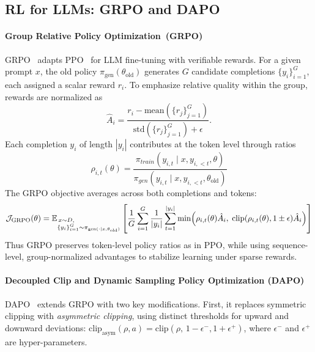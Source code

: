 \documentclass[]{fairmeta} %
\begin{document}
\subsection{RL for LLMs: GRPO and DAPO}\label{appendix:background}

\paragraph{Group Relative Policy Optimization~(GRPO)}
GRPO~\citep{shao2024deepseekmath} adapts PPO~\cite{schulman2017ppo} for LLM fine-tuning with verifiable rewards. 
For a given prompt $x$, the old policy $\pi_{\text{gen}}(\theta_{\text{old}})$ generates $G$ candidate completions $\{y_i\}_{i=1}^G$, each assigned a scalar reward $r_i$. 
To emphasize relative quality within the group, rewards are normalized as
\begin{equation}
    \hat{A}_i = \frac{r_i - \mathrm{mean}(\{r_j\}_{j=1}^G)}{\mathrm{std}(\{r_j\}_{j=1}^G) + \epsilon}. \label{eq:advantage}
\end{equation}
Each completion $y_i$ of length $|y_i|$ contributes at the token level through ratios
\begin{equation}
    \rho_{i,t}(\theta) = \frac{\pi_{train}(y_{i,t} \mid x, y_{i,<t},\theta)}{\pi_{gen}(y_{i,t} \mid x, y_{i,<t}, \theta_{\text{old}})}
\end{equation}
The GRPO objective averages across both completions and tokens:
\begin{equation}
    \mathcal{J}_{\mathrm{GRPO}}(\theta) 
    = \mathbb{E}_{\begin{subarray}{l} \, x \sim D, \\ \{y_i\}_{i=1}^G \sim \pi_{\text{gen}(\cdot \mid x, \theta_{\text{old}})} \end{subarray}}
    \left[ \frac{1}{G} \sum_{i=1}^G \frac{1}{|y_i|} \sum_{t=1}^{|y_i|}
    \min\!\left( \rho_{i,t}(\theta)\hat{A}_i,\; \mathrm{clip}(\rho_{i,t}(\theta), 1\pm \epsilon)\hat{A}_i \right) \right]
\end{equation}
Thus GRPO preserves token-level policy ratios as in PPO, while using sequence-level, group-normalized advantages to stabilize learning under sparse rewards.

\paragraph{Decoupled Clip and Dynamic Sampling Policy Optimization (DAPO)}
DAPO~\citep{yu2025dapo} extends GRPO with two key modifications.  
First, it replaces symmetric clipping with \emph{asymmetric clipping}, using distinct thresholds for upward and downward deviations: $\mathrm{clip}_{\mathrm{asym}}(\rho, a) = \mathrm{clip}(\rho,\, 1-\epsilon^-, 1+\epsilon^+) $, where $\epsilon^-$ and $\epsilon^+$ are hyper-parameters.
\end{document}
